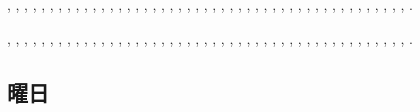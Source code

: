 \documentclass[uplatex, dvipdfmx, paper=a4paper, line_length=45zw, head_space=7zw, foot_space=10zw]{jlreq}
\begin{document}
\begin{description}[rightmargin=3zw]
  \item[ひらがな：] {\ibmfamily {}, , , , , , , , , , , , , , , , , , , , , , , , , , , , , , , , , , , , , , , , , , , , , , , .}
  \item[カタカナ：] {\ibmfamily {}, , , , , , , , , , , , , , , , , , , , , , , , , , , , , , , , , , , , , , , , , , , , , , , .}
\end{description}

\vfil
\subsection{曜日}
\end{document}
